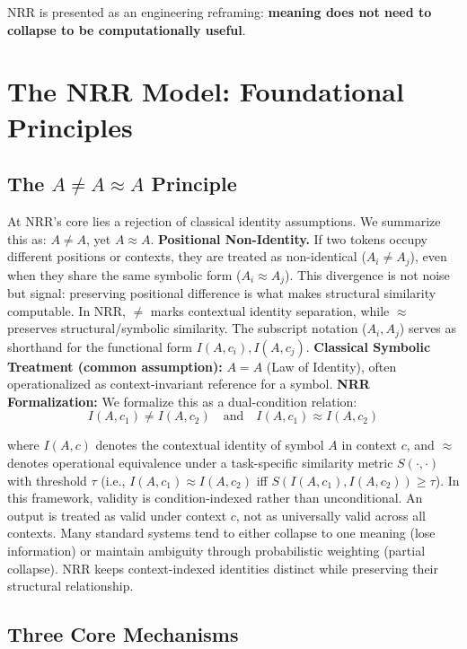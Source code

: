 \documentclass[11pt,a4paper]{article}
\newcommand{\AneqAapproxA}{A \neq A \approx A}
\begin{document}
NRR is presented as an engineering reframing: \textbf{meaning does not need to collapse to be computationally useful}.

\section{The NRR Model: Foundational Principles}

\subsection{The $\AneqAapproxA$ Principle}

At NRR's core lies a rejection of classical identity assumptions.
We summarize this as: $A \neq A$, yet $A \approx A$.
\textbf{Positional Non-Identity.}
If two tokens occupy different positions or contexts, they are treated as non-identical
($A_i \neq A_j$), even when they share the same symbolic form ($A_i \approx A_j$).
This divergence is not noise but signal: preserving positional difference is what makes structural similarity computable.
In NRR, $\neq$ marks contextual identity separation, while $\approx$ preserves structural/symbolic similarity.
The subscript notation ($A_i, A_j$) serves as shorthand for the functional form $I(A, c_i), I(A, c_j)$.
\textbf{Classical Symbolic Treatment (common assumption):} $A = A$ (Law of Identity), often operationalized as context-invariant reference for a symbol.
\textbf{NRR Formalization:}
We formalize this as a dual-condition relation:
\begin{equation}
I(A, c_1) \neq I(A, c_2) \quad \text{and} \quad I(A, c_1) \approx I(A, c_2)
\end{equation}

where $I(A, c)$ denotes the contextual identity of symbol $A$ in context $c$, and $\approx$ denotes operational equivalence under a task-specific similarity metric $S(\cdot,\cdot)$ with threshold $\tau$ (i.e., $I(A, c_1) \approx I(A, c_2)$ iff $S(I(A, c_1), I(A, c_2)) \ge \tau$).
In this framework, validity is condition-indexed rather than unconditional.
An output is treated as valid under context $c$, not as universally valid across all contexts.
Many standard systems tend to either collapse to one meaning (lose information) or maintain ambiguity through probabilistic weighting (partial collapse).
NRR keeps context-indexed identities distinct while preserving their structural relationship.

\subsection{Three Core Mechanisms}
\end{document}
